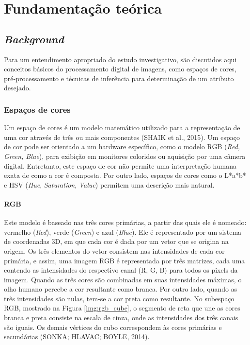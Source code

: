 \chapter{Fundamentação teórica}

\section{\textit{Background}}

Para um entendimento apropriado do estudo investigativo, são discutidos aqui conceitos básicos do processamento digital de imagens, como espaços de cores, pré-processamento e técnicas de inferência para determinação de um atributo desejado. 

\subsection{Espaços de cores}

Um espaço de cores é um modelo matemático utilizado para a representação de uma cor através de três ou mais componentes (SHAIK et al., 2015). Um espaço de cor pode ser orientado a um hardware específico, como o modelo RGB (\textit{Red, Green, Blue}), para exibição em monitores coloridos ou aquisição por uma câmera digital. Entretanto, este espaço de cor não permite uma interpretação humana exata de como a cor é composta. Por outro lado, espaços de cores como o L*a*b* e HSV (\textit{Hue}, \textit{Saturation}, \textit{Value}) permitem uma descrição mais natural. 

\subsubsection{RGB}

Este modelo é baseado nas três cores primárias, a partir das quais ele é nomeado: vermelho (\textit{Red}), verde (\textit{Green}) e azul (\textit{Blue}). Ele é representado por um sistema de coordenadas 3D, em que cada cor é dada por um vetor que se origina na origem. Os três elementos do vetor consistem nas intensidades de cada cor primária, e assim, uma imagem RGB é representada por três matrizes, cada uma contendo as intensidades do respectivo canal (R, G, B) para todos os pixels da imagem. Quando as três cores são combinadas em suas intensidades máximas, o olho humano percebe a cor resultante como branca. Por outro lado, quando as três intensidades são nulas, tem-se a cor preta como resultante. No subespaço RGB, mostrado na Figura \ref{img:rgb_cube}, o segmento de reta que une as cores branca e preta consiste na escala de cinza, onde as intensidades dos três canais são iguais. Os demais vértices do cubo correspondem às cores primárias e secundárias (SONKA; HLAVAC; BOYLE, 2014).  

